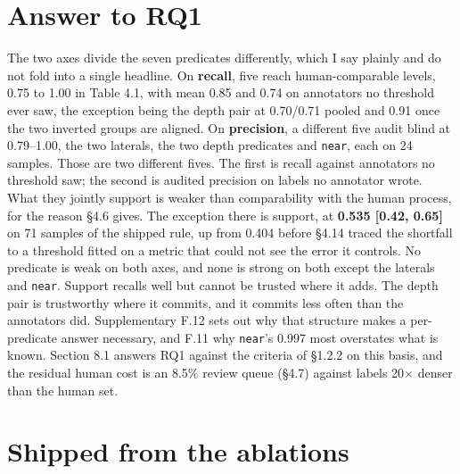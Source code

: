 \section{Answer to RQ1}

The two axes divide the seven predicates differently, which I say plainly and do not fold into a single headline. On \textbf{recall}, five reach human-comparable levels, 0.75 to 1.00 in Table 4.1, with mean 0.85 and 0.74 on annotators no threshold ever saw, the exception being the depth pair at 0.70/0.71 pooled and 0.91 once the two inverted groups are aligned. On \textbf{precision}, a different five audit blind at 0.79--1.00, the two laterals, the two depth predicates and \texttt{near}, each on 24 samples. Those are two different fives. The first is recall against annotators no threshold saw; the second is audited precision on labels no annotator wrote. What they jointly support is weaker than comparability with the human process, for the reason \S{}4.6 gives. The exception there is support, at \textbf{0.535 [0.42, 0.65]} on 71 samples of the shipped rule, up from 0.404 before \S{}4.14 traced the shortfall to a threshold fitted on a metric that could not see the error it controls. No predicate is weak on both axes, and none is strong on both except the laterals and \texttt{near}. Support recalls well but cannot be trusted where it adds. The depth pair is trustworthy where it commits, and it commits less often than the annotators did. Supplementary F.12 sets out why that structure makes a per-predicate answer necessary, and F.11 why \texttt{near}'s 0.997 most overstates what is known. Section 8.1 answers RQ1 against the criteria of \S{}1.2.2 on this basis, and the residual human cost is an 8.5\% review queue (\S{}4.7) against labels 20$\times$ denser than the human set.

\section{Shipped from the ablations}

